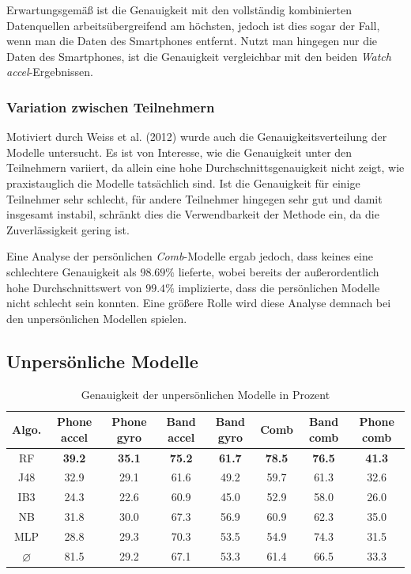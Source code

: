 Erwartungsgemäß ist die Genauigkeit mit den vollständig kombinierten Datenquellen arbeitsübergreifend am höchsten, jedoch ist dies sogar der Fall, wenn man die Daten des Smartphones entfernt. Nutzt man hingegen nur die Daten des Smartphones, ist die Genauigkeit vergleichbar mit den beiden \textit{Watch accel}-Ergebnissen.

\subsubsection{Variation zwischen Teilnehmern}
Motiviert durch Weiss et al. (2012) \cite{Weiss2012} wurde auch die Genauigkeitsverteilung der Modelle untersucht. Es ist von Interesse, wie die Genauigkeit unter den Teilnehmern variiert, da allein eine hohe Durchschnittsgenauigkeit nicht zeigt, wie praxistauglich die Modelle tatsächlich sind. Ist die Genauigkeit für einige Teilnehmer sehr schlecht, für andere Teilnehmer hingegen sehr gut und damit insgesamt instabil, schränkt dies die Verwendbarkeit der Methode ein, da die Zuverlässigkeit gering ist.

Eine Analyse der persönlichen \textit{Comb}-Modelle ergab jedoch, dass keines eine schlechtere Genauigkeit als $98.69 \%$ lieferte, wobei bereits der außerordentlich hohe Durchschnittswert von $99.4 \%$ implizierte, dass die persönlichen Modelle nicht schlecht sein konnten. Eine größere Rolle wird diese Analyse demnach bei den unpersönlichen Modellen spielen.

\subsection{Unpersönliche Modelle}
\label{subsec:eval-impersonal-models}

\begin{table}
	\centering
	\footnotesize
	\begin{tabular}{|c|c|c|c|c|c|c|c|}
		\hline 
		\textbf{Algo.} & \textbf{Phone accel} & \textbf{Phone gyro} & \textbf{Band accel} & \textbf{Band gyro} & \textbf{Comb} & \textbf{Band comb} & \textbf{Phone comb} \\ 
		\hline 
		RF & \textbf{39.2} & \textbf{35.1} & \textbf{75.2} & \textbf{61.7} & \textbf{78.5} & \textbf{76.5} & \textbf{41.3} \\ 
		J48 & 32.9 & 29.1 & 61.6 & 49.2 & 59.7 & 61.3 & 32.6 \\ 
		IB3 & 24.3 & 22.6 & 60.9 & 45.0 & 52.9 & 58.0 & 26.0 \\ 
		NB & 31.8 & 30.0 & 67.3 & 56.9 & 60.9 & 62.3 & 35.0 \\ 
		MLP & 28.8 & 29.3 & 70.3 & 53.5 & 54.9 & 74.3 & 31.5 \\ 
		\hline 
		$\varnothing$ & 81.5 & 29.2 & 67.1 & 53.3 & 61.4 & 66.5 & 33.3 \\ 
		\hline 
	\end{tabular} 
	\caption{Genauigkeit der unpersönlichen Modelle in Prozent}
	\label{tab:accuracy-impersonal}
\end{table}

